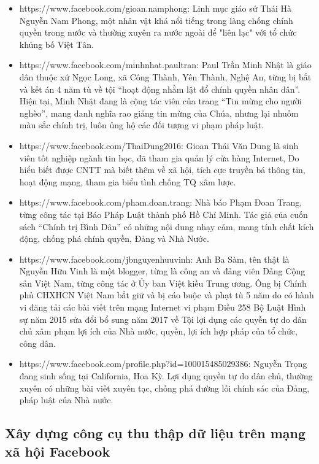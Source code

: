 \begin {itemize}
\item https://www.facebook.com/gioan.namphong: Linh mục giáo sứ Thái Hà Nguyễn Nam Phong, một nhân vật khá nổi tiếng trong làng chống chính quyền trong nước và thường xuyên ra nước ngoài để "liên lạc" với tổ chức khủng bố Việt Tân.

\item https://www.facebook.com/minhnhat.paultran: Paul Trần Minh Nhật là giáo dân thuộc xứ Ngọc Long, xã Công Thành, Yên Thành, Nghệ An, từng bị bắt và kết án 4 năm tù về tội “hoạt động nhằm lật đổ chính quyền nhân dân”. Hiện tại, Minh Nhật đang là cộng tác viên của trang “Tin mừng cho người nghèo”, mang danh nghĩa rao giảng tin mừng của Chúa, nhưng lại nhuốm màu sắc chính trị, luôn ủng hộ các đối tượng vi phạm pháp luật.

\item https://www.facebook.com/ThaiDung2016: Gioan Thái Văn Dung là sinh viên tốt nghiệp ngành tin học, đã tham gia quản lý cửa hàng Internet, Do hiểu biết được CNTT mà biết thêm về xã hội, tích cực truyền bá thông tin, hoạt động mạng, tham gia biểu tình chống TQ xâm lược.

\item https://www.facebook.com/pham.doan.trang: Nhà báo Phạm Đoan Trang, từng công tác tại Báo Pháp Luật thành phố Hồ Chí Minh. Tác giả của cuốn sách “Chính trị Bình Dân” có những nội dung nhạy cảm, mang tính chất kích động, chống phá chính quyền, Đảng và Nhà Nước.

\item https://www.facebook.com/jbnguyenhuuvinh: Anh Ba Sàm, tên thật là Nguyễn Hữu Vinh là một blogger, từng là công an và đảng viên Đảng Cộng sản Việt Nam, từng công tác ở Ủy ban Việt kiều Trung ương. Ông bị Chính phủ CHXHCN Việt Nam bắt giữ và bị cáo buộc và phạt tù 5 năm do có hành vi đăng tải các bài viết trên mạng Internet vi phạm Điều 258 Bộ Luật Hình sự năm 2015 sửa đổi bổ sung năm 2017 về Tội lợi dụng các quyền tự do dân chủ xâm phạm lợi ích của Nhà nước, quyền, lợi ích hợp pháp của tổ chức, công dân.

\item https://www.facebook.com/profile.php?id=100015485029386: Nguyễn Trọng đang sinh sống tại California, Hoa Kỳ. Lợi dụng quyền tự do dân chủ, thường xuyên có những bài viết xuyên tạc, chống phá đường lối chính sác của Đảng, pháp luật của Nhà nước.
\end {itemize}

\subsection{Xây dựng công cụ thu thập dữ liệu trên mạng xã hội Facebook}

